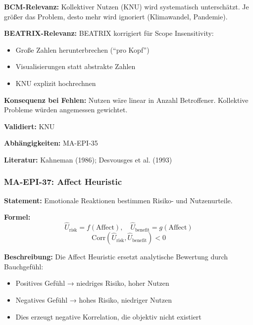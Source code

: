 \textbf{BCM-Relevanz:}
Kollektiver Nutzen (KNU) wird systematisch unterschätzt. Je größer das Problem, desto mehr wird ignoriert (Klimawandel, Pandemie).

\textbf{BEATRIX-Relevanz:}
BEATRIX korrigiert für Scope Insensitivity:
\begin{itemize}
    \item Große Zahlen herunterbrechen (``pro Kopf'')
    \item Visualisierungen statt abstrakte Zahlen
    \item KNU explizit hochrechnen
\end{itemize}

\textbf{Konsequenz bei Fehlen:}
Nutzen wäre linear in Anzahl Betroffener. Kollektive Probleme würden angemessen gewichtet.

\textbf{Validiert:} KNU

\textbf{Abhängigkeiten:} MA-EPI-35

\textbf{Literatur:} Kahneman (1986); Desvousges et al. (1993)


\subsubsection*{MA-EPI-37: Affect Heuristic}

\textbf{Statement:} Emotionale Reaktionen bestimmen Risiko- und Nutzenurteile.

\textbf{Formel:}
\begin{equation}
\hat{U}_{\text{risk}} = f(\text{Affect}), \quad \hat{U}_{\text{benefit}} = g(\text{Affect})
\end{equation}
\begin{equation}
\text{Corr}(\hat{U}_{\text{risk}}, \hat{U}_{\text{benefit}}) < 0
\end{equation}

\textbf{Beschreibung:}
Die Affect Heuristic ersetzt analytische Bewertung durch Bauchgefühl:
\begin{itemize}
    \item Positives Gefühl → niedriges Risiko, hoher Nutzen
    \item Negatives Gefühl → hohes Risiko, niedriger Nutzen
    \item Dies erzeugt negative Korrelation, die objektiv nicht existiert
\end{itemize}

